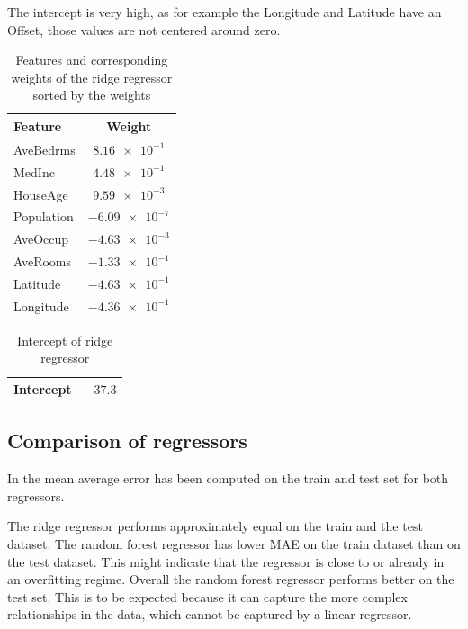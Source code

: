 \documentclass[12pt,a4paper]{scrartcl}
\begin{document}
	The intercept is very high, as for example the Longitude and Latitude have an Offset, those values are not centered around zero.
	
	
	\begin{table}[H]
		\centering
		\begin{tabular}{|l|c|}
			\hline
			Feature    & Weight            \\ \hline
			AveBedrms  & $\num{8.16e-1}$  \\ \hline
			MedInc     & $\num{4.48e-1}$  \\ \hline
			HouseAge   & $\num{9.59e-3}$  \\ \hline
			Population & $\num{-6.09e-7}$ \\ \hline
			AveOccup   & $\num{-4.63e-3}$ \\ \hline
			AveRooms   & $\num{-1.33e-1}$ \\ \hline
			Latitude   & $\num{-4.63e-1}$ \\ \hline
			Longitude  & $\num{-4.36e-1}$ \\ \hline
		\end{tabular}
		\caption{Features and corresponding weights of the ridge regressor sorted by the weights}
		\label{tab:ex1_3_weights}
	\end{table}
	
	\begin{table}[H]
		\centering
		\begin{tabular}{|l|c|} 
			\hline
			Intercept & $-37.3$  \\ \hline
		\end{tabular}
		\caption{Intercept of ridge regressor}
		\label{tab:ex1_3_intercept}
	\end{table}
	
	
	\subsection*{Comparison of regressors}
	
	In  the mean average error has been computed on the train and test set for both regressors.
	
	The ridge regressor performs approximately equal on the train and the test dataset. 
	The random forest regressor has lower MAE on the train dataset than on the test dataset. This might indicate that the regressor is close to or already in an overfitting regime.
	Overall the random forest regressor performs better on the test set. This is to be expected because it can capture the more complex relationships in the data, which cannot be captured by a linear regressor.
	
\end{document}
